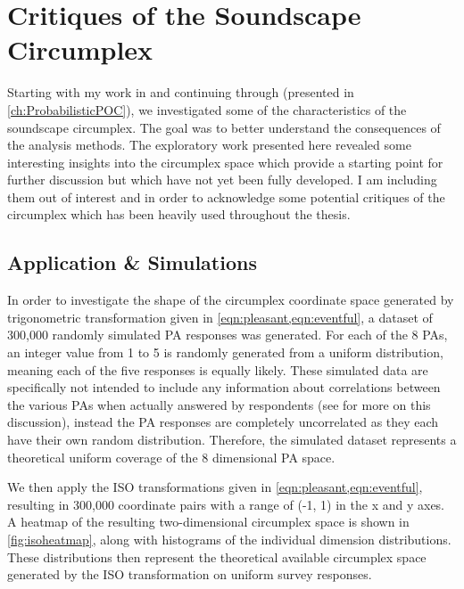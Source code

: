 \chapter{Critiques of the Soundscape Circumplex}
\label{app:CircCritique}

Starting with my work in \citet{Lionello2021Introducing} and continuing through \citet{Mitchell2022How} (presented in \cref{ch:ProbabilisticPOC}), we investigated some of the characteristics of the soundscape circumplex. The goal was to better understand the consequences of the \citet{ISO12913Part3} analysis methods. The exploratory work presented here revealed some interesting insights into the circumplex space which provide a starting point for further discussion but which have not yet been fully developed. I am including them out of interest and in order to acknowledge some potential critiques of the circumplex which has been heavily used throughout the thesis.

\section{Application \& Simulations}
In order to investigate the shape of the circumplex coordinate space generated by trigonometric transformation given in \cref{eqn:pleasant,eqn:eventful}, a dataset of 300,000 randomly simulated PA responses was generated. For each of the 8 PAs, an integer value from 1 to 5 is randomly generated from a uniform distribution, meaning each of the five responses is equally likely. These simulated data are specifically not intended to include any information about correlations between the various PAs when actually answered by respondents (see \citep{Lionello2021Introducing} for more on this discussion), instead the PA responses are completely uncorrelated as they each have their own random distribution. Therefore, the simulated dataset represents a theoretical uniform coverage of the 8 dimensional PA space.

We then apply the ISO transformations given in \cref{eqn:pleasant,eqn:eventful}, resulting in 300,000 coordinate pairs with a range of (-1, 1) in the x and y axes. A heatmap of the resulting two-dimensional circumplex space is shown in \cref{fig:isoheatmap}, along with histograms of the individual dimension distributions. These distributions then represent the theoretical available circumplex space generated by the ISO transformation on uniform survey responses.


